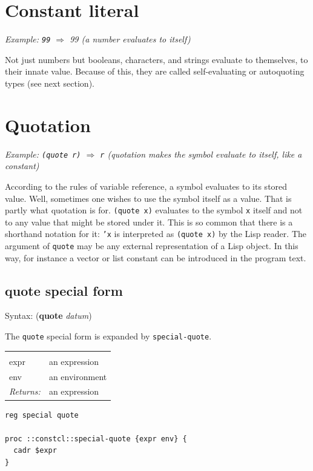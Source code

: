 \documentclass[twoside,9pt]{report}
\begin{document}
\section{Constant literal}
\label{constant-literal}


\emph{Example: \texttt{99} $\Rightarrow$ 99 (a number evaluates to itself)}


Not just numbers but booleans, characters, and strings evaluate to themselves, to their innate value. Because of this, they are called self-evaluating or autoquoting types (see next section).

\section{Quotation}
\label{quotation}


\emph{Example: \texttt{(quote r)} $\Rightarrow$ \texttt{r} (quotation makes the symbol evaluate to itself, like a constant)}


According to the rules of variable reference, a symbol evaluates to its stored value. Well, sometimes one wishes to use the symbol itself as a value. That is partly what quotation is for. \texttt{(quote x)} evaluates to the symbol \texttt{x} itself and not to any value that might be stored under it. This is so common that there is a shorthand notation for it: \texttt{'x} is interpreted as \texttt{(quote x)} by the Lisp reader. The argument of \texttt{quote} may be any external representation of a Lisp object. In this way, for instance a vector or list constant can be introduced in the program text.

\subsection{quote special form}
\label{quote-special-form}


Syntax: (\textbf{quote} \emph{datum})


The \texttt{quote} special form is expanded by \texttt{special-quote}.

\noindent\begin{tabular}{ |p{1.9cm} p{8cm}| }
\hline
\rowcolor[HTML]{CCCCCC} \multicolumn{2}{|l|}{\bf special-quote (internal)} \\
expr & an expression \\
env & an environment \\
\textit{Returns:} & an expression \\
\hline
\end{tabular}
\begin{lstlisting}
reg special quote

proc ::constcl::special-quote {expr env} {
  cadr $expr
}
\end{lstlisting}
\end{document}
